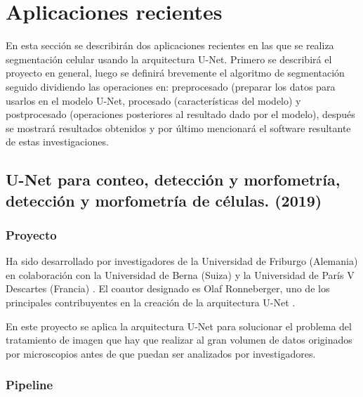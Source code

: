 \chapter{Aplicaciones recientes}\label{apps}

En esta sección se describirán dos aplicaciones recientes en las que se realiza segmentación celular usando la arquitectura U-Net. Primero se describirá el proyecto en general, luego se definirá brevemente el algoritmo de segmentación seguido dividiendo las operaciones en: preprocesado (preparar los datos para usarlos en el modelo U-Net, procesado (características del modelo) y postprocesado (operaciones posteriores al resultado dado por el modelo), después se mostrará resultados obtenidos y por último mencionará el software resultante de estas investigaciones.

\section{U-Net para conteo, detección y morfometría, detección y morfometría de células. (2019)}\label{sec:app1}
\subsection{Proyecto}\label{apps1_proyect}

Ha sido desarrollado por investigadores de la Universidad de Friburgo (Alemania) en colaboración con la Universidad de Berna (Suiza) y la Universidad de París V Descartes (Francia) \cite{Falk2019}. El coautor designado es Olaf Ronneberger, uno de los principales contribuyentes en la creación de la arquitectura U-Net \cite{Ronneberger2015}.

En este proyecto se aplica la arquitectura U-Net para solucionar el problema del tratamiento de imagen que hay que realizar al gran volumen de datos originados por microscopios antes de que puedan ser analizados por investigadores.

\subsection{Pipeline}\label{apps1_pipeline}


